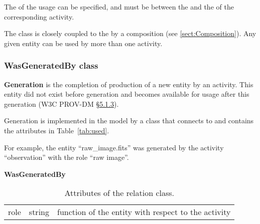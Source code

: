 The  of the usage can be specified, and must be between the  and the  of the corresponding activity.

The  class is closely coupled to the  by a composition (see \ref{sect:Composition}). 
Any given entity can be used by more than one activity.


\subsubsection{WasGeneratedBy class}

\textbf{Generation} is the completion of production of a new entity by an activity. This entity did not exist before generation and becomes available for usage after this generation (W3C PROV-DM \href{https://www.w3.org/TR/prov-dm/#term-Generation}{\S5.1.3}).
        
Generation is implemented in the model by a class  that connects  to  and contains the attributes in Table~\ref{tab:used}.

For example, the entity ``raw\_image.fits'' was generated by the activity ``observation'' with the role ``raw image''.

\begin{table}[ht]
\small
{}\textwidth
\textbf{\normalsize WasGeneratedBy}\vspace{0.25em}\\
\begin{tabulary}{1.0\textwidth}{llL}
\toprule
{} &  & \\
\midrule
role   &  string   &  function of the entity with respect to the activity\\
\bottomrule
\end{tabulary}
\caption[Attributes of the  relation class]{Attributes of the  relation class.}
\label{tab:wasgeneratedby}
\end{table}

